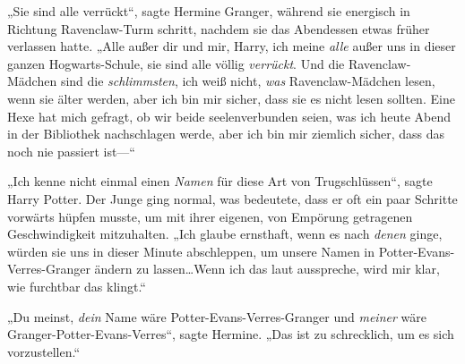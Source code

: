 „Sie sind alle verrückt“, sagte Hermine Granger, während sie energisch in Richtung Ravenclaw-Turm schritt, nachdem sie das Abendessen etwas früher verlassen hatte. „Alle außer dir und mir, Harry, ich meine \emph{alle} außer uns in dieser ganzen Hogwarts-Schule, sie sind alle völlig \emph{verrückt}. Und die Ravenclaw-Mädchen sind die \emph{schlimmsten}, ich weiß nicht, \emph{was} Ravenclaw-Mädchen lesen, wenn sie älter werden, aber ich bin mir sicher, dass sie es nicht lesen sollten. Eine Hexe hat mich gefragt, ob wir beide seelenverbunden seien, was ich heute Abend in der Bibliothek nachschlagen werde, aber ich bin mir ziemlich sicher, dass das noch nie passiert ist—“

„Ich kenne nicht einmal einen \emph{Namen} für diese Art von Trugschlüssen“, sagte Harry Potter. Der Junge ging normal, was bedeutete, dass er oft ein paar Schritte vorwärts hüpfen musste, um mit ihrer eigenen, von Empörung getragenen Geschwindigkeit mitzuhalten. „Ich glaube ernsthaft, wenn es nach \emph{denen} ginge, würden sie uns in dieser Minute abschleppen, um unsere Namen in Potter-Evans-Verres-Granger ändern zu lassen…Wenn ich das laut ausspreche, wird mir klar, wie furchtbar das klingt.“

„Du meinst, \emph{dein} Name wäre Potter-Evans-Verres-Granger und \emph{meiner} wäre Granger-Potter-Evans-Verres“, sagte Hermine. „Das ist zu schrecklich, um es sich vorzustellen.“

